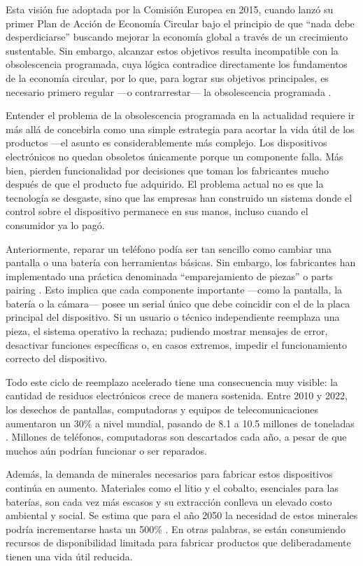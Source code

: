 Esta visión fue adoptada por la Comisión Europea en 2015, cuando lanzó su primer
Plan de Acción de Economía Circular bajo el principio de que ``nada debe
desperdiciarse'' buscando mejorar la economía global a través de un crecimiento
sustentable. Sin embargo, alcanzar estos objetivos resulta incompatible con la
obsolescencia programada, cuya lógica contradice directamente los fundamentos de
la economía circular, por lo que, para lograr sus objetivos principales, es
necesario primero regular —o contrarrestar— la obsolescencia programada
\parencite[p.~729]{malinauskaite2021}.

Entender el problema de la obsolescencia programada en la actualidad requiere ir
más allá de concebirla como una simple estrategia para acortar la vida útil de
los productos —el asunto es considerablemente más complejo. Los dispositivos
electrónicos no quedan obsoletos únicamente porque un componente falla. Más
bien, pierden funcionalidad por decisiones que toman los fabricantes mucho
después de que el producto fue adquirido. El problema actual no es que la
tecnología se desgaste, sino que las empresas han construido un sistema donde el
control sobre el dispositivo permanece en sus manos, incluso cuando el
consumidor ya lo pagó. 

Anteriormente, reparar un teléfono podía ser tan sencillo como cambiar una
pantalla o una batería con herramientas básicas. Sin embargo, los fabricantes
han implementado una práctica denominada “emparejamiento de piezas” o parts
pairing \parencite[p.~105]{alfieri2023}. Esto implica que cada componente
importante —como la pantalla, la batería o la cámara— posee un serial único que
debe coincidir con el de la placa principal del dispositivo. Si un usuario o
técnico independiente reemplaza una pieza, el sistema operativo la rechaza;
pudiendo mostrar mensajes de error, desactivar funciones específicas o, en casos
extremos, impedir el funcionamiento correcto del dispositivo. 

Todo este ciclo de reemplazo acelerado tiene una consecuencia muy visible: la
cantidad de residuos electrónicos crece de manera sostenida. Entre 2010 y 2022,
los desechos de pantallas, computadoras y equipos de telecomunicaciones
aumentaron un 30\% a nivel mundial, pasando de 8.1 a 10.5 millones de toneladas
\parencite[p.~108]{unctad2024}. Millones de teléfonos, computadoras son
descartados cada año, a pesar de que muchos aún podrían funcionar o ser
reparados. 

Además, la demanda de minerales necesarios para fabricar estos dispositivos
continúa en aumento. Materiales como el litio y el cobalto, esenciales para las
baterías, son cada vez más escasos y su extracción conlleva un elevado costo
ambiental y social. Se estima que para el año 2050 la necesidad de estos
minerales podría incrementarse hasta un 500\% \parencite[p.~41]{unctad2024}. En
otras palabras, se están consumiendo recursos de disponibilidad limitada para
fabricar productos que deliberadamente tienen una vida útil reducida. 

